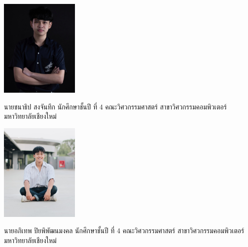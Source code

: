 \documentclass[semifinal]{cpecmu}
\author{นายชนาธิป สงจันทึก}{Chanathip Songchanthuek}{620612145}
\author{นายอภิเทพ ปิยพิพัฒนมงคล}{Apithep Piyaphiphathanamongkol}{620612168}
\begin{document}


\pagestyle{empty}\cleardoublepage
\normalspacing \setcounter{page}{1}  \pagestyle{cpecmu}





\ifproject

\fi



\ifproject
\normalspacing
\appendix


\ifglossary\glossarypage\fi

\ifindex\indexpage\fi

\begin{biosketch}
\begin{center}
  \includegraphics[width=1.5in]{./image/profile_bank.jpg}
\end{center}
นายชนาธิป สงจันทึก นักศึกษาชั้นปี ที่ 4 คณะวิศวกรรมศาสตร์ สาขาวิศวกรรมคอมพิวเตอร์ มหาวิทยาลัยเชียงใหม่
\begin{center}
  \includegraphics[width=1.5in]{./image/profile_kao.jpg}
\end{center}
นายอภิเทพ ปิยพิพัฒนมงคล นักศึกษาชั้นปี ที่ 4 คณะวิศวกรรมศาสตร์ สาขาวิศวกรรมคอมพิวเตอร์ มหาวิทยาลัยเชียงใหม่
\end{biosketch}
\fi %
\end{document}
